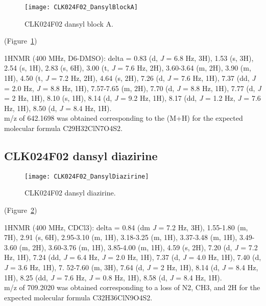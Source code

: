 \begin{figure}
\centering
\texttt{[image: CLK024F02\_DansylBlockA]}
\caption{CLK024F02 dansyl block A.}
\label{fig:CLK024F02_DansylBlockA}
\end{figure}

\noindent
(Figure~\ref{fig:CLK024F02_DansylBlockA})

\noindent
1HNMR (400 MHz, D6-DMSO): delta = 0.83 (d, {\it J} = 6.8 Hz, 3H), 1.53 (s, 3H), 2.54 (s, 1H), 2.83 (s, 6H), 3.00 (t, {\it J} = 7.6 Hz, 2H), 3.60-3.64 (m, 2H), 3.90 (m, 1H), 4.50 (t, {\it J} = 7.2 Hz, 2H), 4.64 (s, 2H), 7.26 (d, {\it J} = 7.6 Hz, 1H), 7.37 (dd, {\it J} = 2.0 Hz, {\it J} = 8.8 Hz, 1H), 7.57-7.65 (m, 2H), 7.70 (d, {\it J} = 8.8 Hz, 1H), 7.77 (d, {\it J} = 2 Hz, 1H), 8.10 (s, 1H), 8.14 (d, {\it J} = 9.2 Hz, 1H), 8.17 (dd, {\it J} = 1.2 Hz, {\it J} = 7.6 Hz, 1H), 8.50 (d, {\it J} = 8.4 Hz, 1H). \\

\noindent
m/z of 642.1698 was obtained corresponding to the (M+H) for the expected molecular formula C29H32ClN7O4S2. \\

\clearpage

\subsection{CLK024F02 dansyl diazirine}

\begin{figure}
\centering
\texttt{[image: CLK024F02\_DansylDiazirine]}
\caption{CLK024F02 dansyl diazirine.}
\label{fig:CLK024F02_DansylDiazirine}
\end{figure}

\noindent
(Figure~\ref{fig:CLK024F02_DansylDiazirine})

\noindent
1HNMR (400 MHz, CDCl3): delta = 0.84 (dm {\it J} = 7.2 Hz, 3H), 1.55-1.80 (m, 7H), 2.91 (s, 6H), 2.95-3.10 (m, 1H), 3.18-3.25 (m, 1H), 3.37-3.48 (m, 1H), 3.49-3.60 (m, 2H), 3.60-3.76 (m, 1H), 3.85-4.00 (m, 1H), 4.59 (s, 2H), 7.20 (d, {\it J} = 7.2 Hz, 1H), 7.24 (dd, {\it J} = 6.4 Hz, {\it J} = 2.0 Hz, 1H), 7.37 (d, {\it J} = 4.0 Hz, 1H), 7.40 (d, {\it J} = 3.6 Hz, 1H), 7. 52-7.60 (m, 3H), 7.64 (d, {\it J} = 2 Hz, 1H), 8.14 (d, {\it J} = 8.4 Hz, 1H), 8.25 (dd, {\it J} = 7.6 Hz, {\it J} = 0.8 Hz, 1H), 8.58 (d, {\it J} = 8.4 Hz, 1H). \\

\noindent
m/z of 709.2020 was obtained corresponding to a loss of N2, CH3, and 2H for the expected molecular formula C32H36ClN9O4S2. \\


